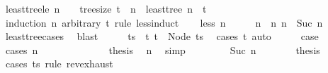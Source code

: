 \begin{isabellebody}
%
\endisatagproof
{\isafoldproof}%
%
\isadelimproof
\isanewline
%
\endisadelimproof
\isanewline
{}\isamarkupfalse%
\ least{\isacharunderscore}{\kern0pt}tree{\isacharunderscore}{\kern0pt}le{\isacharcolon}{\kern0pt}\ {\isachardoublequoteopen}n\ {\isasymnoteq}\ {}\ {\isasymLongrightarrow}\ tree{\isacharunderscore}{\kern0pt}size\ t\ {\isasymge}\ n\ {\isasymLongrightarrow}\ least{\isacharunderscore}{\kern0pt}tree\ n\ {\isasymle}\ t{\isachardoublequoteclose}\isanewline
%
\isadelimproof
%
\endisadelimproof
%
\isatagproof
{}\isamarkupfalse%
\ {\isacharparenleft}{\kern0pt}induction\ n\ arbitrary{\isacharcolon}{\kern0pt}\ t\ rule{\isacharcolon}{\kern0pt}\ less{\isacharunderscore}{\kern0pt}induct{\isacharparenright}{\kern0pt}\isanewline
\ \ \isamarkupfalse%
\ {\isacharparenleft}{\kern0pt}less\ n{\isacharparenright}{\kern0pt}\isanewline
\ \ \isamarkupfalse%
\ \isamarkupfalse%
\ n{\isacharprime}{\kern0pt}\ \ n{\isacharcolon}{\kern0pt}\ {\isachardoublequoteopen}n\ {\isacharequal}{\kern0pt}\ Suc\ n{\isacharprime}{\kern0pt}{\isachardoublequoteclose}\ \isamarkupfalse%
\ least{\isacharunderscore}{\kern0pt}tree{\isachardot}{\kern0pt}cases\ \isamarkupfalse%
\ blast\isanewline
\ \ \isamarkupfalse%
\ \isamarkupfalse%
\ ts\ \ t{\isacharcolon}{\kern0pt}\ {\isachardoublequoteopen}t\ {\isacharequal}{\kern0pt}\ Node\ ts{\isachardoublequoteclose}\ \isamarkupfalse%
\ {\isacharparenleft}{\kern0pt}cases\ t{\isacharparenright}{\kern0pt}\ auto\isanewline
\ \ \isamarkupfalse%
\ \isamarkupfalse%
\ {\isacharquery}{\kern0pt}case\isanewline
\ \ \isamarkupfalse%
\ {\isacharparenleft}{\kern0pt}cases\ n{\isacharprime}{\kern0pt}{\isacharparenright}{\kern0pt}\isanewline
\ \ \ \ \isamarkupfalse%
\ {}\isanewline
\ \ \ \ \isamarkupfalse%
\ \isamarkupfalse%
\ {\isacharquery}{\kern0pt}thesis\ \isamarkupfalse%
\ n\ \isamarkupfalse%
\ simp\isanewline
\ \ \isamarkupfalse%
\isanewline
\ \ \ \ \isamarkupfalse%
\ {\isacharparenleft}{\kern0pt}Suc\ n{\isacharprime}{\kern0pt}{\isacharprime}{\kern0pt}{\isacharparenright}{\kern0pt}\isanewline
\ \ \ \ \isamarkupfalse%
\ \isamarkupfalse%
\ {\isacharquery}{\kern0pt}thesis\isanewline
\ \ \ \ \isamarkupfalse%
\ {\isacharparenleft}{\kern0pt}cases\ ts\ rule{\isacharcolon}{\kern0pt}\ rev{\isacharunderscore}{\kern0pt}exhaust{\isacharparenright}{\kern0pt}\isanewline

\end{isabellebody}
